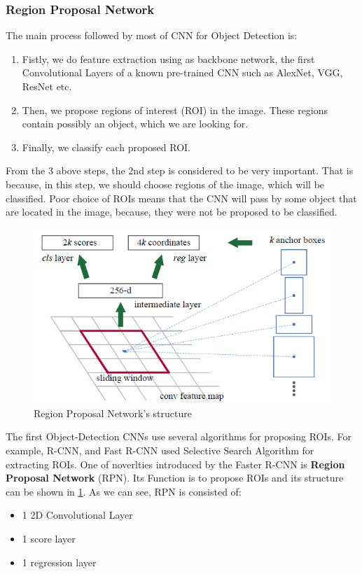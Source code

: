 
\subsubsection{ Region Proposal Network}

The main process followed by most of CNN for Object Detection is:
\begin{enumerate}
\item Fistly, we do feature extraction using as backbone network, the first Convolutional Layers of a known pre-trained CNN such
  as AlexNet, VGG, ResNet etc.
\item Then, we propose regions of interest (ROI) in the image. These regions contain possibly an object, which we are looking for.
\item Finally, we classify each proposed ROI.
\end{enumerate}

From the 3 above steps, the 2nd step is considered to be very important. That is because, in this step, we should choose regions of
the image, which will be classified. Poor choice of ROIs means that the CNN will pass by some object that are located in the image,
because, they were not be proposed to be classified.

\begin{figure}[h]
  \centering
  \includegraphics[scale=0.3]{./figures/RPN_structure}
  \caption{ Region Proposal Network's structure}
  \label{fig:rpn_structure}
\end{figure}
The first Object-Detection CNNs use several algorithms for proposing ROIs. For example, R-CNN\cite{DBLP:journals/corr/GirshickDDM13},
and Fast R-CNN\cite{Girshick:2015:FR:2919332.2920125} used Selective Search Algorithm for extracting ROIs.
One of noverlties introduced by the Faster R-CNN\cite{Ren:2015:FRT:2969239.2969250} is \textbf{Region Proposal Network} (RPN). Its
Function is to propose ROIs and its structure can be shown in \ref{fig:rpn_structure}. As we can see, RPN is consisted of:
\begin{itemize}
\item 1 2D Convolutional Layer
\item 1 score layer 
\item 1 regression layer
\end{itemize}

